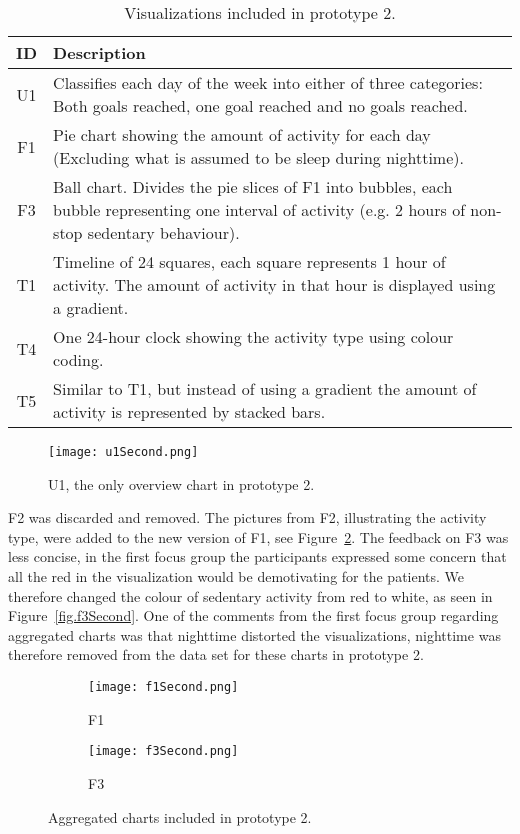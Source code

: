 \begin{table}[h!]
  \centering
  \begin{tabular}{|c|p{11cm}|}
    \hline
    \textbf{ID} & \textbf{Description} \\ \hline
    U1 & Classifies each day of the week into either of three categories: Both goals reached, one goal reached and no goals reached. \\ \hline
    F1 & Pie chart showing the amount of activity for each day (Excluding what is assumed to be sleep during nighttime). \\ \hline
    F3 & Ball chart. Divides the pie slices of F1 into bubbles, each bubble representing one interval of activity (e.g. 2 hours of non-stop sedentary behaviour). \\ \hline
    T1 & Timeline of 24 squares, each square represents 1 hour of activity. The amount of activity in that hour is displayed using a gradient. \\ \hline
    T4 & One 24-hour clock showing the activity type using colour coding. \\ \hline
    T5 & Similar to T1, but instead of using a gradient the amount of activity is represented by stacked bars. \\ \hline
  \end{tabular}
  \caption[Visualizations in the second prototype]{Visualizations included in prototype 2.}
  \label{tab:runProtDesc2}
\end{table}

\begin{figure}[h!]
  \centering
  \texttt{[image: u1Second.png]}
  \caption[Second version of U1]{U1, the only overview chart in prototype 2.}
  \label{fig:uSecond}
\end{figure}

F2 was discarded and removed. The pictures from F2, illustrating the activity type, were added to the new version of F1, see Figure~\ref{fig:f1Second}. The feedback on F3 was less concise, in the first focus group the participants expressed some concern that all the red in the visualization would be demotivating for the patients. We therefore changed the colour of sedentary activity from red to white, as seen in Figure~\ref{fig.f3Second}. One of the comments from the first focus group regarding aggregated charts was that nighttime distorted the visualizations, nighttime was therefore removed from the data set for these charts in prototype 2.

\begin{figure}[h!]
  \centering
  \begin{subfigure}[b]{0.45\textwidth}
    \centering
    \texttt{[image: f1Second.png]}
    \caption{F1}
    \label{fig:f1Second}
  \end{subfigure}
  \begin{subfigure}[b]{0.45\textwidth}
    \centering
    \texttt{[image: f3Second.png]}
    \caption{F3}
    \label{fig:f3Second}
  \end{subfigure}
  \caption[Second version of F1 and F3]{Aggregated charts included in prototype 2.}
  \label{fig:aggCharts}
\end{figure}

